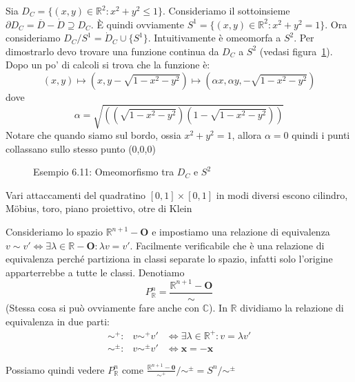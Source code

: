 \begin{example}
    Sia \(D_C = \{(x,y) \in \mathbb{R}^2:x^2+y^2\le 1\} \). Consideriamo il
    sottoinsieme \(\partial D_C = \overline{D} - \dot{D} \supseteq D_C \). È
    quindi ovviamente \(S^{1} = \{(x,y) \in \mathbb{R}^2 : x^2+y^2 = 1\} \). Ora
    consideriamo \(D_C / S^{1} = \dot{D}_C \cup \{S^{1}\} \). Intuitivamente è
    omeomorfa a \(S^{2}\). Per dimostrarlo devo trovare una funzione continua da
    \(D_C\) a \(S^{2}\) (vedasi figura~\ref{fig:esempio}). Dopo un po' di
    calcoli si trova che la funzione è:
    \[
        (x, y) \mapsto (x, y -\sqrt{1- x^2 - y^2}) \mapsto (\alpha x, \alpha y,
        -\sqrt{1 - x^2 - y^2})
    \]
    dove 
    \[
        \alpha = \sqrt{((\sqrt{1-x^2-y^2})(1-\sqrt{1-x^2-y^2}))}
    \]
    Notare che quando siamo sul bordo, ossia \(x^2+y^2=1\), allora \(\alpha =
    0\) quindi i punti collassano sullo stesso punto (0,0,0)
\end{example}
\begin{figure}[ht]
    \centering
    \caption{Esempio 6.11: Omeomorfismo tra \(D_C\) e \(S^{2}\) }\label{fig:esempio}
\end{figure}
\begin{example}
    Vari attaccamenti del quadratino \([0,1] \times [0,1]\) in modi diversi
    escono cilindro, Möbius, toro, piano proiettivo, otre di Klein
\end{example}
\begin{example}
    Consideriamo lo spazio \(\mathbb{R}^{n+1} - \mathbf{O}\) e impostiamo una
    relazione di equivalenza \(v\sim v' \iff \exists \lambda \in \mathbb{R} -
    \mathbf{O} : \lambda v = v'\). Facilmente verificabile che è una relazione
    di equivalenza perché partiziona in classi separate lo spazio, infatti solo
    l'origine apparterrebbe a tutte le classi. Denotiamo
    \[
        P_ \mathbb{R}^{n} = \frac{\mathbb{R}^{n+1} - \mathbf{O}}{\sim }
    \]
    (Stessa cosa si può ovviamente fare anche con \(\mathbb{C}\)). In
    \(\mathbb{R}\) dividiamo la
    relazione di equivalenza in due parti:
    \begin{align*}
        \sim ^{+} : & v \sim^{+} v' &\iff \exists \lambda \in \mathbb{R}^{+}:v =
        \lambda v' \\
        \sim^{\pm} : & v\sim ^{\pm}v' &\iff \mathbf{x} = -\mathbf{x}
    \end{align*}

    Possiamo quindi vedere \(P_ \mathbb{R}^{n}\) come \(\frac{\mathbb{R}^{n+1} -
    \mathbf{0}}{\sim^{+}} / \sim^{\pm} = S^{n} / \sim^{\pm}\) 

\end{example}

